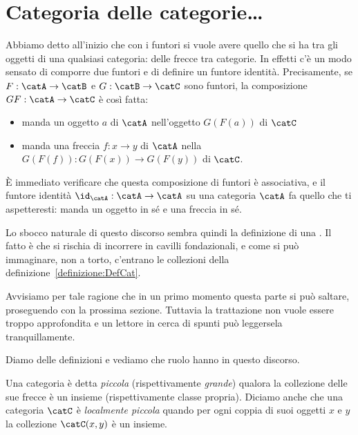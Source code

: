 
\section{Categoria delle categorie\dots{}}

Abbiamo detto all'inizio che con i funtori si vuole avere quello che si ha tra gli oggetti di una qualsiasi categoria: delle frecce tra categorie. In effetti c'è un modo sensato di comporre due funtori e di definire un funtore identità. Precisamente, se \(F : \catA \to \catB\) e \(G : \catB \to \catC\) sono funtori, la composizione \(GF : \catA \to \catC\) è così fatta:
\begin{itemize}
\item manda un oggetto \(a\) di \(\catA\) nell'oggetto \(G(F(a))\) di \(\catC\)
\item manda una freccia \(f : x \to y\) di \(\catA\) nella \(G(F(f)) : G(F(x)) \to G(F(y))\) di \(\catC\).
\end{itemize}

È immediato verificare che questa composizione di funtori è associativa, e il funtore identità \(\id_\catA : \catA \to \catA\) su una categoria \(\catA\) fa quello che ti aspetteresti: manda un oggetto in sé e una freccia in sé.

Lo sbocco naturale di questo discorso sembra quindi la definizione di una . Il fatto è che si rischia di incorrere in cavilli fondazionali, e come si può immaginare, non a torto, c'entrano le collezioni della definizione~\ref{definizione:DefCat}.

Avvisiamo per tale ragione che in un primo momento questa parte si può saltare, proseguendo con la prossima sezione. Tuttavia la trattazione non vuole essere troppo approfondita e un lettore in cerca di spunti può leggersela tranquillamente.

Diamo delle definizioni e vediamo che ruolo hanno in questo discorso.

\begin{definizione}
Una categoria è detta {\em piccola} (rispettivamente {\em grande}) qualora la collezione delle sue frecce è un insieme (rispettivamente classe propria). Diciamo anche che una categoria \(\catC\) è {\em localmente piccola} quando per ogni coppia di suoi oggetti \(x\) e \(y\) la collezione \(\catC(x, y)\) è un insieme. 
\end{definizione}

